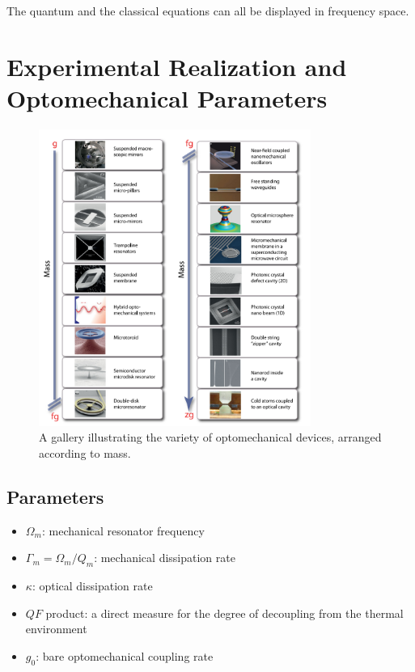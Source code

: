 \documentclass[8pt,a4paper,twocolumn]{article} %
\numberwithin{equation}{section} %
\begin{document}
			The quantum and the classical equations can all be displayed in frequency space.







	\section{Experimental Realization and Optomechanical Parameters} %
	\label{sec:experimental_realization}
		\begin{figure}[!h]
			\centering
			\includegraphics[width=3.5in]{optoMechDevices.png}
			\caption{A gallery illustrating the variety of optomechanical devices, arranged according to mass. \cite{Aspelmeyer2014} }
			\label{pic:optoMechDevices}
		\end{figure}

		\subsection{Parameters} %
		\label{sub:parameters}
			\begin{itemize}
				\item $ \Omega_m $: mechanical resonator frequency
				\item $ \Gamma_m = \Omega_m/Q_m $: mechanical dissipation rate
				\item $ \kappa $: optical dissipation rate
				\item $QF$ product: a direct measure for the degree of decoupling from the thermal environment
				\item $ g_0 $: bare optomechanical coupling rate
			\end{itemize}
\end{document}
